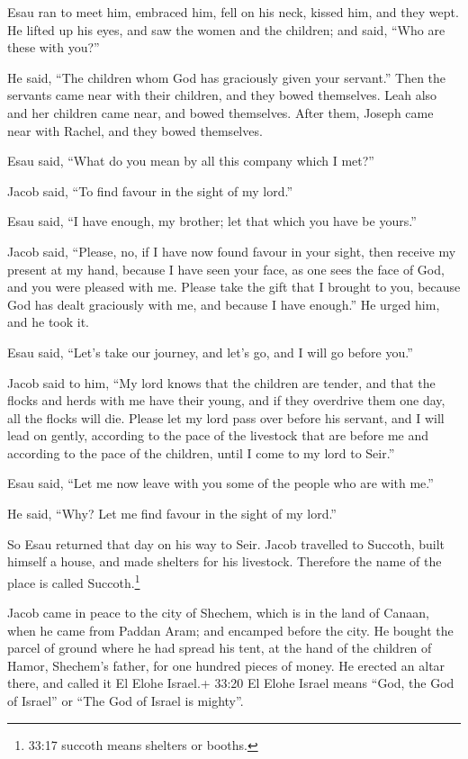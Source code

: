  Esau ran to meet him, embraced him, fell on his neck,
kissed him, and they wept.  He lifted up his eyes, and saw
the women and the children; and said, ``Who are these with you?''

He said, ``The children whom God has graciously given your servant.''
 Then the servants came near with their children, and they
bowed themselves.  Leah also and her children came near, and
bowed themselves. After them, Joseph came near with Rachel, and they
bowed themselves.

 Esau said, ``What do you mean by all this company which I
met?''

Jacob said, ``To find favour in the sight of my lord.''

 Esau said, ``I have enough, my brother; let that which you
have be yours.''

 Jacob said, ``Please, no, if I have now found favour in
your sight, then receive my present at my hand, because I have seen your
face, as one sees the face of God, and you were pleased with me.
 Please take the gift that I brought to you, because God
has dealt graciously with me, and because I have enough.'' He urged him,
and he took it.

 Esau said, ``Let's take our journey, and let's go, and I
will go before you.''

 Jacob said to him, ``My lord knows that the children are
tender, and that the flocks and herds with me have their young, and if
they overdrive them one day, all the flocks will die. 
Please let my lord pass over before his servant, and I will lead on
gently, according to the pace of the livestock that are before me and
according to the pace of the children, until I come to my lord to
Seir.''

 Esau said, ``Let me now leave with you some of the people
who are with me.''

He said, ``Why? Let me find favour in the sight of my lord.''

 So Esau returned that day on his way to Seir.
 Jacob travelled to Succoth, built himself a house, and
made shelters for his livestock. Therefore the name of the place is
called Succoth.\footnote{33:17 succoth means shelters or booths.}

 Jacob came in peace to the city of Shechem, which is in
the land of Canaan, when he came from Paddan Aram; and encamped before
the city.  He bought the parcel of ground where he had
spread his tent, at the hand of the children of Hamor, Shechem's father,
for one hundred pieces of money.  He erected an altar
there, and called it El Elohe Israel.+ 33:20 El Elohe Israel means
``God, the God of Israel'' or ``The God of Israel is mighty''.

